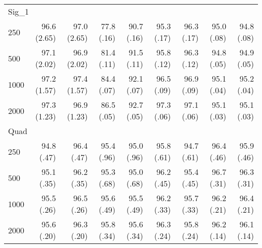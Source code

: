 \documentclass{article}
\begin{document}
\begin{tabular}{lrrrrrrrr}
       \hline   
 \multicolumn{9}{l}{Sig\_1} \\ 
250 & 96.6 (2.65) & 97.0 (2.65) & 77.8 (.16) & 90.7 (.16) & 95.3 (.17) & 96.3 (.17) & 95.0 (.08) & 94.8 (.08) \\ 
  500 & 97.1 (2.02) & 96.9 (2.02) & 81.4 (.11) & 91.5 (.11) & 95.8 (.12) & 96.3 (.12) & 94.8 (.05) & 94.9 (.05) \\ 
  1000 & 97.2 (1.57) & 97.4 (1.57) & 84.4 (.07) & 92.1 (.07) & 96.5 (.09) & 96.9 (.09) & 95.1 (.04) & 95.2 (.04) \\ 
  2000 & 97.3 (1.23) & 96.9 (1.23) & 86.5 (.05) & 92.7 (.05) & 97.3 (.06) & 97.1 (.06) & 95.1 (.03) & 95.1 (.03) \\ 
       \hline   
 \multicolumn{9}{l}{Quad} \\ 
250 & 94.8 (.47) & 96.4 (.47) & 95.4 (.96) & 95.0 (.96) & 95.8 (.61) & 94.7 (.61) & 96.4 (.46) & 95.9 (.46) \\ 
  500 & 95.1 (.35) & 96.2 (.35) & 95.3 (.68) & 95.0 (.68) & 96.2 (.45) & 95.4 (.45) & 96.7 (.31) & 96.3 (.31) \\ 
  1000 & 95.5 (.26) & 96.5 (.26) & 95.6 (.49) & 95.5 (.49) & 96.2 (.33) & 95.7 (.33) & 96.2 (.21) & 96.4 (.21) \\ 
  2000 & 95.6 (.20) & 96.3 (.20) & 95.8 (.34) & 95.6 (.34) & 96.3 (.24) & 95.8 (.24) & 96.2 (.14) & 96.1 (.14) \\ 
   \hline
\end{tabular}
\end{document}
